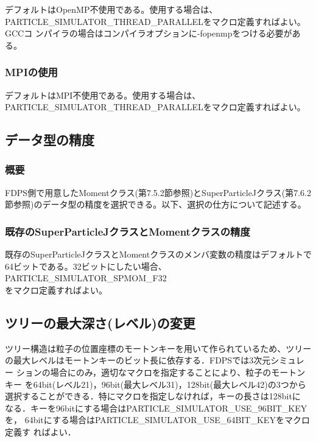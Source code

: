 デフォルトはOpenMP不使用である。使用する場合は、
\\ PARTICLE\_SIMULATOR\_THREAD\_PARALLELをマクロ定義すればよい。GCCコ
ンパイラの場合はコンパイラオプションに-fopenmpをつける必要がある。

\subsubsection{MPIの使用}

デフォルトはMPI不使用である。使用する場合は、
PARTICLE\_SIMULATOR\_THREAD\_PARALLELをマクロ定義すればよい。

\subsection{データ型の精度}
\subsubsection{概要}
FDPS側で用意したMomentクラス(第7.5.2節参照)とSuperParticleJクラス(第7.6.2節参照)のデータ型の精度を選択できる。以下、選択の仕方について記述する。

\subsubsection{既存のSuperParticleJクラスとMomentクラスの精度}
既存のSuperParticleJクラスとMomentクラスのメンバ変数の精度はデフォルトで64ビットである。32ビットにしたい場合、\\
PARTICLE\_SIMULATOR\_SPMOM\_F32 \\
をマクロ定義すればよい。





\subsection{ツリーの最大深さ(レベル)の変更}
\label{sec:compile_tree_level}


ツリー構造は粒子の位置座標のモートンキーを用いて作られているため、ツリー
の最大レベルはモートンキーのビット長に依存する．FDPSでは3次元シミュレー
ションの場合にのみ，適切なマクロを指定することにより、粒子のモートンキー
を64bit(レベル21)，96bit(最大レベル31)，128bit(最大レベル42)の3つから
選択することができる．特にマクロを指定しなければ，キーの長さは128bitに
なる．キーを96bitにする場合はPARTICLE\_SIMULATOR\_USE\_96BIT\_KEYを，
64bitにする場合はPARTICLE\_SIMULATOR\_USE\_64BIT\_KEYをマクロ定義す
ればよい．

